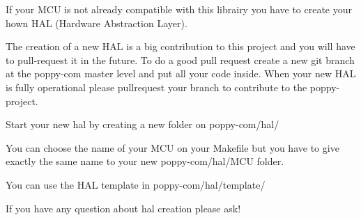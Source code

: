 If your M\-C\-U is not already compatible with this librairy you have to create your hown H\-A\-L (Hardware Abstraction Layer).

The creation of a new H\-A\-L is a big contribution to this project and you will have to pull-\/request it in the future. To do a good pull request create a new git branch at the poppy-\/com master level and put all your code inside. When your new H\-A\-L is fully operational please pullrequest your branch to contribute to the poppy-\/project.

Start your new hal by creating a new folder on poppy-\/com/hal/

You can choose the name of your M\-C\-U on your Makefile but you have to give exactly the same name to your new poppy-\/com/hal/\-M\-C\-U folder.

You can use the H\-A\-L template in poppy-\/com/hal/template/

If you have any question about hal creation please ask! 